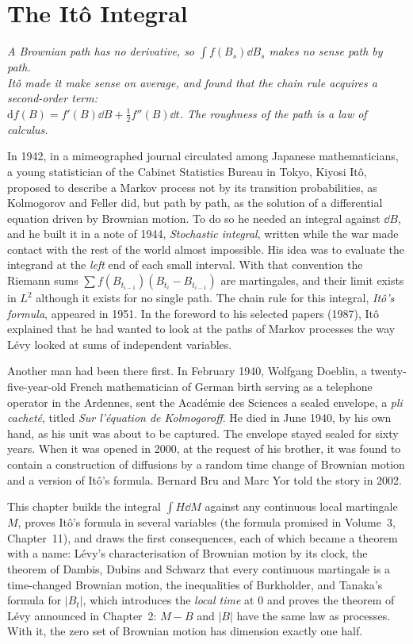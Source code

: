 \chapter{The It\^o Integral}

\begin{center}\itshape
A Brownian path has no derivative, so $\int f(B_s)\dd B_s$ makes no sense path by path.\\
It\^o made it make sense on average, and found that the chain rule acquires a second-order term:\\
$\mathrm df(B)=f'(B)\dd B+\frac12f''(B)\dd t$. The roughness of the path is a law of calculus.
\end{center}

In 1942, in a mimeographed journal circulated among Japanese mathematicians, a young statistician of the Cabinet Statistics Bureau in Tokyo, Kiyosi It\^o, proposed to describe a Markov
process not by its transition probabilities, as Kolmogorov and Feller did, but path by path, as the solution of a differential equation driven by Brownian motion. To do so he needed an
integral against $\dd B$, and he built it in a note of 1944, \emph{Stochastic integral}, written while the war made contact with the rest of the world almost impossible. His idea was to
evaluate the integrand at the \emph{left} end of each small interval. With that convention the Riemann sums $\sum f(B_{t_{i-1}})(B_{t_i}-B_{t_{i-1}})$ are martingales, and their limit
exists in $L^2$ although it exists for no single path. The chain rule for this integral, \emph{It\^o's formula}, appeared in 1951. In the foreword to his selected papers (1987), It\^o explained
that he had wanted to look at the paths of Markov processes the way L\'evy looked at sums of independent variables.

Another man had been there first. In February 1940, Wolfgang Doeblin, a twenty-five-year-old French mathematician of German birth serving as a telephone operator in the Ardennes, sent the
Acad\'emie des Sciences a sealed envelope, a \emph{pli cachet\'e}, titled \emph{Sur l'\'equation de Kolmogoroff}. He died in June 1940, by his own hand, as his unit was about to be captured.
The envelope stayed sealed for sixty years. When it was opened in 2000, at the request of his brother, it was found to contain a construction of diffusions by a random time change of Brownian
motion and a version of It\^o's formula. Bernard Bru and Marc Yor told the story in 2002.

This chapter builds the integral $\int H\dd M$ against any continuous local martingale $M$, proves It\^o's formula in several variables (the formula promised in Volume~3, Chapter~11), and draws
the first consequences, each of which became a theorem with a name: L\'evy's characterisation of Brownian motion by its clock, the theorem of Dambis, Dubins and Schwarz that every continuous
martingale is a time-changed Brownian motion, the inequalities of Burkholder, and Tanaka's formula for $|B_t|$, which introduces the \emph{local time} at $0$ and proves the theorem of L\'evy announced
in Chapter~2: $M-B$ and $|B|$ have the same law as processes. With it, the zero set of Brownian motion has dimension exactly one half.

